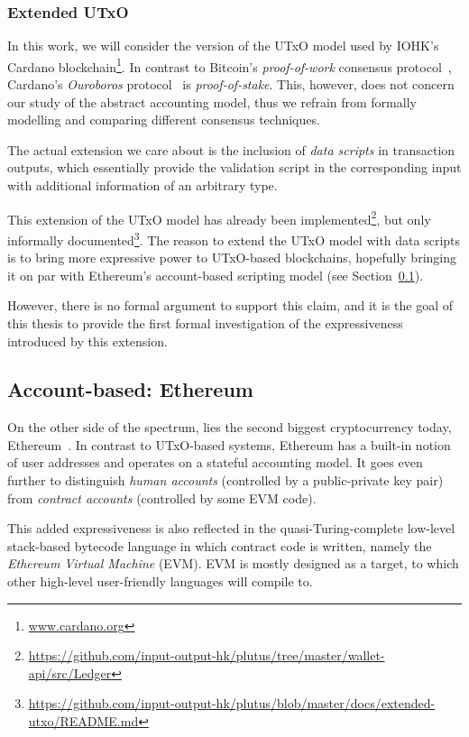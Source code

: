 \documentclass[acmsmall,nonacm=true,screen=true]{acmart}
\newcommand\site[1]{\footnote{\url{#1}}}
\begin{document}
\subsubsection{Extended UTxO}
In this work, we will consider the version of the UTxO model used by IOHK's Cardano blockchain\site{www.cardano.org}.
In contrast to Bitcoin's \textit{proof-of-work} consensus protocol~\cite{bitcoin}, 
Cardano's \textit{Ouroboros} protocol~\cite{ouroboros} is \textit{proof-of-stake}.
This, however, does not concern our study of the abstract accounting model, thus we
refrain from formally modelling and comparing different consensus techniques.

The actual extension we care about is the inclusion of \textit{data scripts} in transaction
outputs, which essentially provide the validation script in the corresponding input with additional
information of an arbitrary type.

This extension of the UTxO model has already been
implemented\site{https://github.com/input-output-hk/plutus/tree/master/wallet-api/src/Ledger}, but
only informally documented\site{https://github.com/input-output-hk/plutus/blob/master/docs/extended-utxo/README.md}.
The reason to extend the UTxO model with data scripts is to bring more expressive power to UTxO-based blockchains,
hopefully bringing it on par with Ethereum's account-based scripting model (see Section~\ref{subsec:ethereum}).

However, there is no formal argument to support this claim, and it is the goal of this thesis
to provide the first formal investigation of the expressiveness introduced by this extension.

\subsection{Account-based: Ethereum} \label{subsec:ethereum}
On the other side of the spectrum, lies the second biggest cryptocurrency today, Ethereum~\cite{ethereum}.
In contrast to UTxO-based systems, Ethereum has a built-in notion of user addresses and operates on a
stateful accounting model. It goes even further to distinguish \textit{human accounts}
(controlled by a public-private key pair) from \textit{contract accounts} (controlled by some EVM code).

This added expressiveness is also reflected in the quasi-Turing-complete low-level stack-based bytecode language
in which contract code is written, namely the \textit{Ethereum Virtual Machine} (EVM).
EVM is mostly designed as a target, to which other high-level user-friendly languages will compile to.
\end{document}
